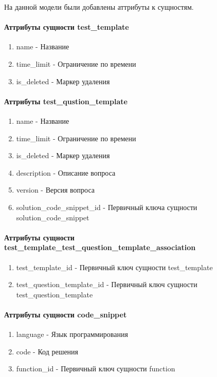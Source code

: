\documentclass{article}
\begin{document}
На данной модели были добавлены аттрибуты к сущностям.
\paragraph{Аттрибуты сущности test\_template}
\begin{enumerate}
	\item name - Название
	\item time\_limit - Ограничение по времени
	\item is\_deleted - Маркер удаления
\end{enumerate}

\paragraph{Аттрибуты test\_qustion\_template}
\begin{enumerate}
	\item name - Название
	\item time\_limit - Ограничение по времени
	\item is\_deleted - Маркер удаления
	\item description - Описание вопроса
	\item version - Версия вопроса
	\item solution\_code\_snippet\_id - Первичный ключа
	сущности solution\_code\_snippet  
\end{enumerate}

\paragraph{Аттрибуты сущности test\_template\_test\_question\_template\_association}
\begin{enumerate}
	\item test\_template\_id - Первичный ключ сущности
	test\_template
	\item test\_question\_template\_id - Первичный ключ сущности
	test\_question\_template
\end{enumerate}

\paragraph{Аттрибуты сущности code\_snippet}
\begin{enumerate}
	\item language - Язык программирования
	\item code - Код решения
	\item function\_id - Первичный ключ сущности function
\end{enumerate}
\end{document}
